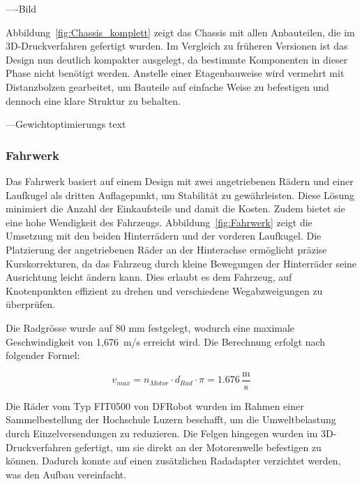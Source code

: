 \documentclass[main.tex]{subfiles} %
\begin{document}
----Bild

Abbildung~\ref{fig:Chassis_komplett} zeigt das Chassis mit allen Anbauteilen, die im 
3D-Druckverfahren gefertigt wurden. Im Vergleich zu früheren Versionen ist das Design nun deutlich 
kompakter ausgelegt, da bestimmte Komponenten in dieser Phase nicht benötigt werden. Anstelle einer 
Etagenbauweise wird vermehrt mit Distanzbolzen gearbeitet, um Bauteile auf einfache Weise zu 
befestigen und dennoch eine klare Struktur zu behalten.

---Gewichtoptimierungs text


\subsubsection*{Fahrwerk}

Das Fahrwerk basiert auf einem Design mit zwei angetriebenen Rädern und einer
Laufkugel als dritten Auflagepunkt, um Stabilität zu gewährleisten. Diese
Lösung minimiert die Anzahl der Einkaufsteile und damit die Kosten. Zudem
bietet sie eine hohe Wendigkeit des Fahrzeugs. Abbildung~\ref{fig:Fahrwerk}
zeigt die Umsetzung mit den beiden Hinterrädern und der vorderen Laufkugel. Die
Platzierung der angetriebenen Räder an der Hinterachse ermöglicht präzise
Kurskorrekturen, da das Fahrzeug durch kleine Bewegungen der Hinterräder seine
Ausrichtung leicht ändern kann. Dies erlaubt es dem Fahrzeug, auf Knotenpunkten
effizient zu drehen und verschiedene Wegabzweigungen zu überprüfen.


Die Radgrösse wurde auf 80 mm festgelegt, wodurch eine maximale Geschwindigkeit
von 1,676~m/s erreicht wird. Die Berechnung erfolgt nach folgender Formel:

\[ v_{max} = n_{Motor} \cdot d_{Rad} \cdot \pi = 1.676 \, \frac{\text{m}}{\text{s}} \]

Die Räder vom Typ FIT0500 von DFRobot wurden im Rahmen einer Sammelbestellung der 
Hochschule Luzern beschafft, um die Umweltbelastung durch Einzelversendungen 
zu reduzieren. Die Felgen hingegen wurden im 3D-Druckverfahren gefertigt, um 
sie direkt an der Motorenwelle befestigen zu können. Dadurch konnte auf einen 
zusätzlichen Radadapter verzichtet werden, was den Aufbau vereinfacht.
\end{document}
